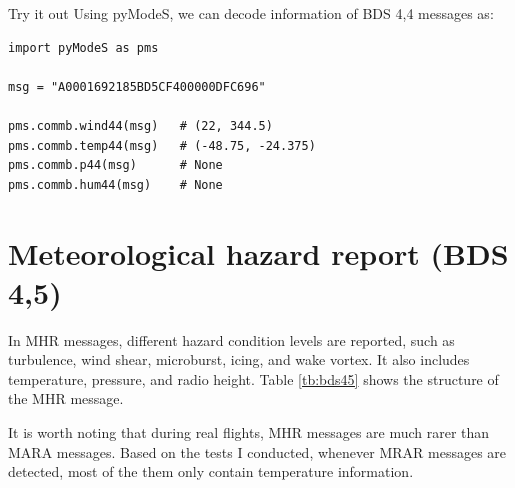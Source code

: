 \begin{notebox}{Try it out}
Using pyModeS, we can decode information of BDS 4,4 messages as: 

\begin{verbatim}
import pyModeS as pms

msg = "A0001692185BD5CF400000DFC696"

pms.commb.wind44(msg)   # (22, 344.5)
pms.commb.temp44(msg)   # (-48.75, -24.375)
pms.commb.p44(msg)      # None
pms.commb.hum44(msg)    # None
\end{verbatim}

\end{notebox}

\clearpage
\section{Meteorological hazard report (BDS 4,5)}

In MHR messages, different hazard condition levels are reported, such as turbulence, wind shear, microburst, icing, and wake vortex. It also includes temperature, pressure, and radio height. Table \ref{tb:bds45} shows the structure of the MHR message.

It is worth noting that during real flights, MHR messages are much rarer than MARA messages. Based on the tests I conducted, whenever MRAR messages are detected, most of the them only contain temperature information.

